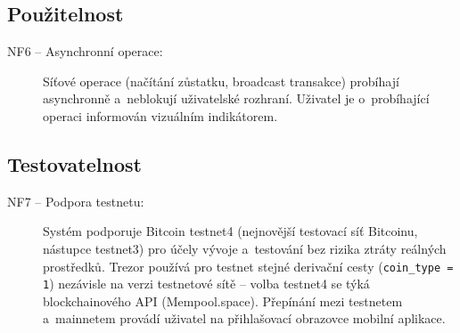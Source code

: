 \subsection{Použitelnost}

\begin{description}
  \item[NF6 -- Asynchronní operace:]
    Síťové operace (načítání zůstatku, broadcast transakce) probíhají asynchronně
    a~neblokují uživatelské rozhraní. Uživatel je o~probíhající operaci informován
    vizuálním indikátorem.
\end{description}

\subsection{Testovatelnost}

\begin{description}
  \item[NF7 -- Podpora testnetu:]
    Systém podporuje Bitcoin testnet4 (nejnovější testovací síť Bitcoinu,
    nástupce testnet3) pro účely vývoje a~testování bez rizika ztráty
    reálných prostředků. Trezor používá pro testnet stejné derivační cesty
    (\texttt{coin\_type = 1}) nezávisle na verzi testnetové sítě -- volba
    testnet4 se týká blockchainového API (Mempool.space). Přepínání
    mezi testnetem a~mainnetem provádí uživatel na přihlašovací obrazovce
    mobilní aplikace.
\end{description}
